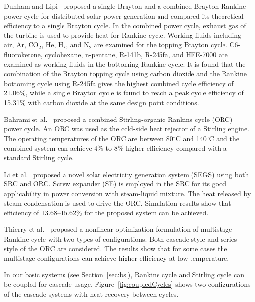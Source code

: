 Dunham and Lipi~\cite{Dunham2013} proposed a single Brayton and a combined Brayton-Rankine power cycle for distributed solar power generation and compared its theoretical efficiency to a single Brayton cycle. In the combined power cycle, exhaust gas of the turbine is used to provide heat for Rankine cycle. Working fluids including air, Ar, CO$_2$, He, H$_2$, and N$_2$ are examined for the topping Brayton cycle. C6-fluoroketone, cyclohexane, n-pentane, R-141b, R-245fa, and HFE-7000 are examined as working fluids in the bottoming Rankine cycle. It is found that the combination of the Brayton topping cycle using carbon dioxide and the Rankine bottoming cycle using R-245fa gives the highest combined cycle efficiency of 21.06\%, while a single Brayton cycle is found to reach a peak cycle efficiency of 15.31\% with carbon dioxide at the same design point conditions.

Bahrami et al.~\cite{Bahrami2013} proposed a combined Stirling-organic Rankine cycle (ORC) power cycle. An ORC was used as the cold-side heat rejector of a Stirling engine. The operating temperatures of the ORC are between 80$\mathrm{^\circ C}$ and 140$\mathrm{^\circ C}$ and the combined system can achieve 4\% to 8\% higher efficiency compared with a standard Stirling cycle.

Li et al.~\cite{Li2016a} proposed a novel solar electricity generation system (SEGS) using both SRC and ORC. Screw expander (SE) is employed in the SRC for its good applicability in power conversion with steam-liquid mixture. The heat released by steam condensation is used to drive the ORC. Simulation results show that efficiency of 13.68–15.62\% for the proposed system can be achieved.

Thierry et al.~\cite{Thierry2016} proposed a nonlinear optimization formulation of multistage Rankine cycle with two types of configurations. Both cascade style and series style of the ORC are considered. The results show that for some cases the multistage configurations can achieve higher efficiency at low temperature.

In our basic systems (see Section~\ref{sec:bs}), Rankine cycle and Stirling cycle can be coupled for cascade usage. Figure~\ref{fig:coupledCycles} shows two configurations of the cascade systems with heat recovery between cycles.

